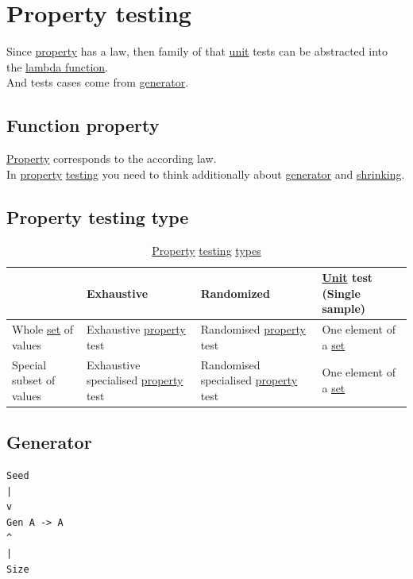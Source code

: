 \documentclass[a4paper,14pt,oneside]{book}
\begin{document}
\section{\label{orgfb4b4bb}Property testing}
\label{sec:orge335508}
Since \hyperref[org91a1c9f]{property} has a law, then family of that \hyperref[orgea7ee99]{unit} tests can be abstracted into the \hyperref[org61a8244]{lambda function}.\\
And tests cases come from \hyperref[org8c8d3b6]{generator}.\\

\subsection{\label{orgcf19e42}Function property}
\label{sec:orgb391b40}
\hyperref[org91a1c9f]{Property} corresponds to the according law.\\
In \hyperref[org91a1c9f]{property} \hyperref[orgb234d91]{testing} you need to think additionally about \hyperref[org8c8d3b6]{generator} and \hyperref[org5b8f43e]{shrinking}.\\

\subsection{\label{orgbde4312}Property testing type}
\label{sec:org623f59e}

\begin{table}[htbp]
\caption{\label{tab:property-testing-type}\hyperref[org91a1c9f]{Property} \hyperref[orgb234d91]{testing} \hyperref[org9e7edc9]{types}}
\centering
\begin{tabular}{llll}
\hline
 & Exhaustive & Randomized & \hyperref[orgea7ee99]{Unit} test (Single sample)\\
\hline
Whole \hyperref[orge119629]{set} of values & Exhaustive \hyperref[org91a1c9f]{property} test & Randomised \hyperref[org91a1c9f]{property} test & One element of a \hyperref[orge119629]{set}\\
Special subset of values & Exhaustive specialised \hyperref[org91a1c9f]{property} test & Randomised specialised \hyperref[org91a1c9f]{property} test & One element of a \hyperref[orge119629]{set}\\
\hline
\end{tabular}
\end{table}

\subsection{\label{org8c8d3b6}Generator}
\label{sec:org48ed3bb}
\begin{verbatim}
Seed
|
v
Gen A -> A
^
|
Size
\end{verbatim}
\end{document}
